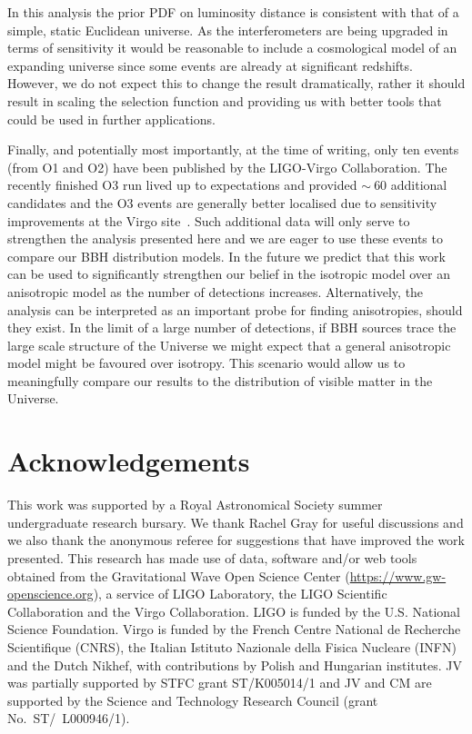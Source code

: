\documentclass[usenatbib,useAMS]{mnras}
\begin{document}
In this analysis the prior \ac{PDF} on luminosity distance is consistent
with that of a simple, static Euclidean universe. As the interferometers are
being upgraded in terms of sensitivity it would be reasonable to include a
cosmological model of an expanding universe since some events are already at
significant redshifts. However, we do not expect this to change the result
dramatically, rather it should result in scaling the selection function and
providing us with better tools that could be used in further applications.

Finally, and potentially most importantly, at the time of writing, only ten
events (from O1 and O2) have been published by the LIGO-Virgo Collaboration. The
recently finished O3 run lived up to expectations and provided $\sim~60$
additional candidates and the O3 events are generally better
localised due to sensitivity improvements at the Virgo site~\citep{GraceDB}.
Such additional
data will only serve to strengthen the analysis presented here and we are eager
to use these events to compare our \ac{BBH} distribution models. In the
future we predict that this work can be used to significantly strengthen our
belief in the isotropic model over an anisotropic model as the number of
detections increases. Alternatively, the analysis can be interpreted as an
important probe for finding anisotropies, should they exist. In the limit of
a large number of detections, if \ac{BBH} sources trace the large scale structure
of the Universe we might expect that a general anisotropic model might be favoured
over isotropy. This scenario would allow us to meaningfully compare our results to
the distribution of visible matter in the Universe. 

\section*{Acknowledgements}

This work was supported by a Royal Astronomical Society summer undergraduate
research bursary. We thank Rachel Gray for useful discussions and we also thank
the anonymous referee for suggestions that have improved the work presented.
This research has made use of data, software and/or web tools obtained from the
Gravitational Wave Open Science Center (\url{https://www.gw-openscience.org}),
a service of LIGO Laboratory, the LIGO Scientific Collaboration and the Virgo
Collaboration. LIGO is funded by the U.S.  National Science Foundation. Virgo
is funded by the French Centre National de Recherche Scientifique (CNRS), the
Italian Istituto Nazionale della Fisica Nucleare (INFN) and the Dutch Nikhef,
with contributions by Polish and Hungarian institutes. JV was partially supported
by STFC grant ST/K005014/1 and JV and CM are supported by the Science and
Technology Research Council (grant No.~ST/~L000946/1).
\end{document}
